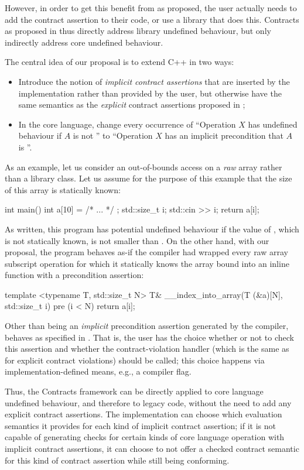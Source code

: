 However, in order to get this benefit from \cite{P2900R9} as proposed, the user actually needs to add the contract assertion  to their code, or use a library that does this. Contracts as proposed in \cite{P2900R9} thus directly address library undefined behaviour, but only indirectly address core undefined behaviour.

The central idea of our proposal is to extend C++ in two ways:
\begin{itemize}
\item Introduce the notion of \emph{implicit contract assertions} that are inserted by the implementation rather than provided by the user, but otherwise have the same semantics as the \emph{explicit} contract assertions proposed in \cite{P2900R9};
\item In the core language, change every occurrence of ``Operation $X$ has undefined behaviour if $A$ is not '' to ``Operation $X$ has an implicit precondition that $A$ is ''.
\end{itemize}
As an example, let us consider an out-of-bounds access on a \emph{raw} array rather than a library class. Let us assume for the purpose of this example that the size  of this array is statically known:
\begin{codeblock}
int main() {
  int a[10] = { /* ... */ };
  std::size_t i; std::cin >> i;
  return a[i];
}
\end{codeblock}
As written, this program has potential undefined behaviour if the value of , which is not statically known, is not smaller than . On the other hand, with our proposal, the program behaves as-if the compiler had wrapped every raw array subscript operation for which it statically knows the array bound  into an inline function with a precondition assertion:
\begin{codeblock}
template <typename T, std::size_t N>
T& __index_into_array(T (&a)[N], std::size_t i) 
pre (i < N) {
  return a[i];
}
\end{codeblock}
Other than being an \emph{implicit} precondition assertion generated by the compiler,  behaves as specified in \cite{P2900R9}. That is, the user has the choice whether or not to check this assertion and whether the contract-violation handler (which is the same as for explicit contract violations) should be called; this choice happens via implementation-defined means, e.g., a compiler flag. 

Thus, the Contracts framework can be directly applied to core language undefined behaviour, and therefore to legacy code, without the need to add any explicit contract assertions. The implementation can choose which evaluation semantics it provides for each kind of implicit contract assertion; if it is not capable of generating checks for certain kinds of core language operation with implicit contract assertions, it can choose to not offer a checked contract semantic for this kind of contract assertion while still being conforming.

